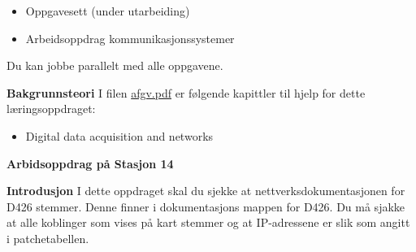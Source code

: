 \begin{itemize}[noitemsep]
	\item Oppgavesett (under utarbeiding)
	\item Arbeidsoppdrag kommunikasjonssystemer
\end{itemize}


 
\vskip 5pt 

Du kan jobbe parallelt med alle oppgavene. 

\vskip 5pt 
\textbf{Bakgrunnsteori}
 I filen \href {https://autofaget.no/pdfs/afgv.pdf}{afgv.pdf} er følgende kapittler til hjelp for dette læringsoppdraget:
 \begin{itemize}[noitemsep]
	 \item Digital data acquisition and networks 
 \end{itemize}
\newpage
\textbf{Arbidsoppdrag på Stasjon 14}
\vskip 1cm
\vskip 5pt

\textbf{Introdusjon}
 I dette oppdraget skal du sjekke at nettverksdokumentasjonen for D426 stemmer. Denne finner i dokumentasjons mappen for D426. 
Du  må sjakke at alle koblinger som vises på kart stemmer og at IP-adressene er slik som  angitt i patchetabellen. 

